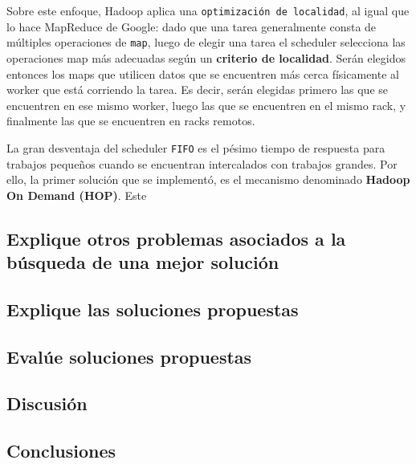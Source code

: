 \documentclass[11pt, a4paper, twoside]{article}
\begin{document}
Sobre este enfoque, Hadoop aplica una \texttt{optimización de localidad}, al
igual que lo hace MapReduce de Google: dado que una tarea generalmente consta de
múltiples operaciones de \texttt{map}, luego de elegir una tarea el scheduler
selecciona las operaciones map más adecuadas según un \textbf{criterio de
localidad}. Serán elegidos entonces los maps que utilicen datos que se
encuentren más cerca físicamente al worker que está corriendo la tarea. Es
decir, serán elegidas primero las que se encuentren en ese mismo worker, luego
las que se encuentren en el mismo rack, y finalmente las que se encuentren en
racks remotos.

La gran desventaja del scheduler \texttt{FIFO} es el pésimo tiempo de respuesta
para trabajos pequeños cuando se encuentran intercalados con trabajos grandes.
Por ello, la primer solución que se implementó, es el mecanismo denominado
\textbf{Hadoop On Demand (HOP)}. Este

\clearpage
\subsection {\footnotesize Explique otros problemas asociados a la búsqueda de una mejor solución}
\label{investigacion-5}

\clearpage
\subsection {\footnotesize Explique las soluciones propuestas}
\label{investigacion-6}

\clearpage
\subsection {\footnotesize Evalúe soluciones propuestas}
\label{investigacion-7}

\clearpage
\subsection {\footnotesize Discusión}
\label{investigacion-8}

\clearpage
\subsection {\footnotesize Conclusiones}
\label{investigacion-9}

\clearpage
\end{document}
